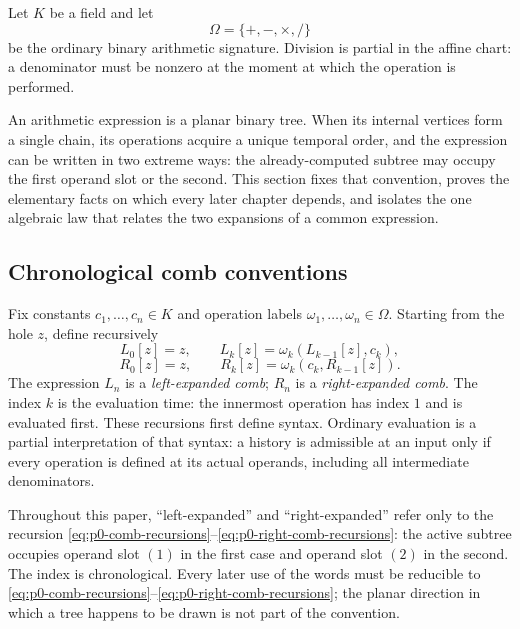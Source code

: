 Let $K$ be a field and let
\[
  \Omega=\{+,-,\times,/\}
\]
be the ordinary binary arithmetic signature.  Division is partial in the
affine chart: a denominator must be nonzero at the moment at which the
operation is performed.

An arithmetic expression is a planar binary tree.  When its internal vertices
form a single chain, its operations acquire a unique temporal order, and the
expression can be written in two extreme ways: the already-computed subtree may
occupy the first operand slot or the second.  This section fixes that
convention, proves the elementary facts on which every later chapter depends,
and isolates the one algebraic law that relates the two expansions of a common
expression.

\subsection{Chronological comb conventions}

\begin{definition}
\label{def:p0-left-right-combs}
Fix constants $c_1,\ldots,c_n\in K$ and operation labels
$\omega_1,\ldots,\omega_n\in\Omega$.  Starting from the hole $z$, define
recursively
\begin{equation}\label{eq:p0-comb-recursions}
  L_0[z]=z,
  \qquad
  L_k[z]=\omega_k(L_{k-1}[z],c_k),
\end{equation}
\begin{equation}\label{eq:p0-right-comb-recursions}
  R_0[z]=z,
  \qquad
  R_k[z]=\omega_k(c_k,R_{k-1}[z]).
\end{equation}
The expression $L_n$ is a \emph{left-expanded comb}; $R_n$ is a
\emph{right-expanded comb}.  The index $k$ is the evaluation time: the
innermost operation has index $1$ and is evaluated first.
These recursions first define syntax.  Ordinary evaluation is a partial
interpretation of that syntax: a history is admissible at an input only if
every operation is defined at its actual operands, including all intermediate
denominators.
\end{definition}

\begin{convention}
\label{conv:p0-left-right-convention}
Throughout this paper, ``left-expanded'' and ``right-expanded'' refer only to
the recursion \eqref{eq:p0-comb-recursions}--\eqref{eq:p0-right-comb-recursions}:
the active subtree occupies operand slot $(1)$ in the first case and operand
slot $(2)$ in the second.  The index is chronological.  Every later use of the
words must be reducible to \eqref{eq:p0-comb-recursions}--\eqref{eq:p0-right-comb-recursions};
the planar direction in which a tree happens to be drawn is not part of the
convention.
\end{convention}

